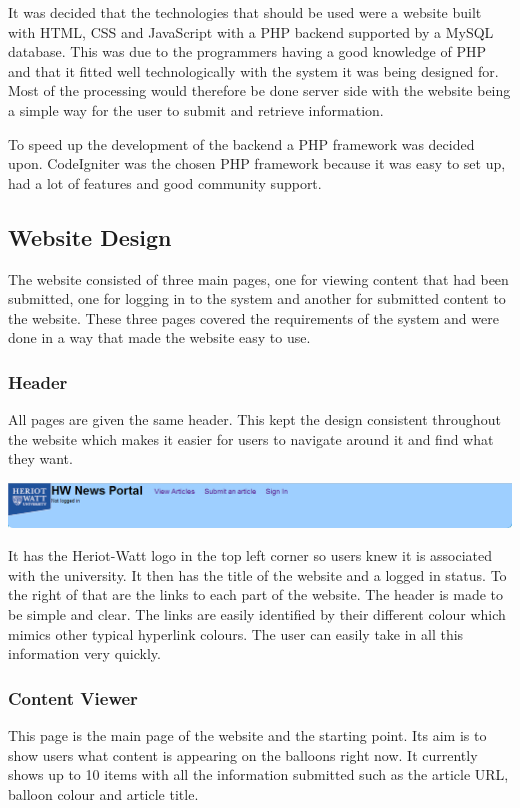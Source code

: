 It was decided that the technologies that should be used were a website built with HTML, CSS and JavaScript with a PHP backend supported by a MySQL database. This was due to the programmers having a good knowledge of PHP and that it fitted well technologically with the system it was being designed for. Most of the processing would therefore be done server side with the website being a simple way for the user to submit and retrieve information.

To speed up the development of the backend a PHP framework was decided upon. CodeIgniter was the chosen PHP framework because it was easy to set up, had a lot of features and good community support.

\subsection{Website Design}
The website consisted of three main pages, one for viewing content that had been submitted, one for logging in to the system and another for submitted content to the website. These three pages covered the requirements of the system and were done in a way that made the website easy to use. 

\subsubsection{Header}
All pages are given the same header. This kept the design consistent throughout the website which makes it easier for users to navigate around it and find what they want.

\includegraphics[width=\textwidth]{Diagrams/Website-Header}

It has the Heriot-Watt logo in the top left corner so users knew it is associated with the university. It then has the title of the website and a logged in status. To the right of that are the links to each part of the website. The header is made to be simple and clear. The links are easily identified by their different colour which mimics other typical hyperlink colours. The user can easily take in all this information very quickly.

\subsubsection{Content Viewer}
This page is the main page of the website and the starting point. Its aim is to show users what content is appearing on the balloons right now. It currently shows up to 10 items with all the information submitted such as the article URL, balloon colour and article title.

